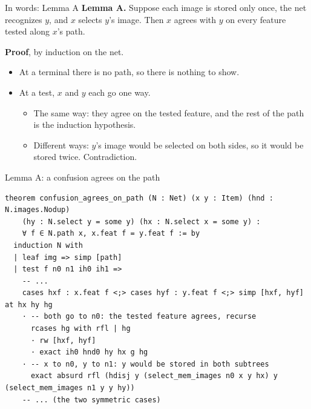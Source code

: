 \documentclass[aspectratio=169,11pt]{beamer}
\begin{document}
\begin{frame}{In words: Lemma A}
  \textbf{Lemma A.} Suppose each image is stored only once, the net recognizes $y$, and $x$ selects $y$'s image. Then $x$ agrees with $y$ on every feature tested along $x$'s path.
  \bigskip

  \textbf{Proof}, by induction on the net.
  \begin{itemize}
    \item At a terminal there is no path, so there is nothing to show.
    \item At a test, $x$ and $y$ each go one way.
    \begin{itemize}
      \item The same way: they agree on the tested feature, and the rest of the path is the induction hypothesis.
      \item Different ways: $y$'s image would be selected on both sides, so it would be stored twice. Contradiction.
    \end{itemize}
  \end{itemize}
\end{frame}


\begin{frame}[fragile]{Lemma A: a confusion agrees on the path}
\begin{Verbatim}
theorem confusion_agrees_on_path (N : Net) (x y : Item) (hnd : N.images.Nodup)
    (hy : N.select y = some y) (hx : N.select x = some y) :
    ∀ f ∈ N.path x, x.feat f = y.feat f := by
  induction N with
  | leaf img => simp [path]
  | test f n0 n1 ih0 ih1 =>
    -- ...
    cases hxf : x.feat f <;> cases hyf : y.feat f <;> simp [hxf, hyf] at hx hy hg
    · -- both go to n0: the tested feature agrees, recurse
      rcases hg with rfl | hg
      · rw [hxf, hyf]
      · exact ih0 hnd0 hy hx g hg
    · -- x to n0, y to n1: y would be stored in both subtrees
      exact absurd rfl (hdisj y (select_mem_images n0 x y hx) y (select_mem_images n1 y y hy))
    -- ... (the two symmetric cases)
\end{Verbatim}
\end{frame}
\end{document}
